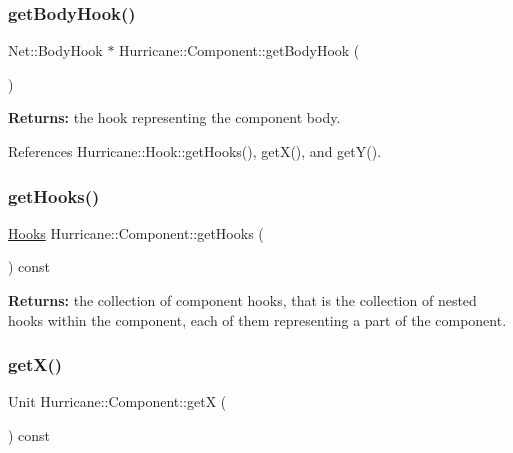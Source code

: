 \subsubsection{\texorpdfstring{get\+Body\+Hook()}{getBodyHook()}}
{\footnotesize\ttfamily Net\+::\+Body\+Hook $\ast$ Hurricane\+::\+Component\+::get\+Body\+Hook (\begin{DoxyParamCaption}{ }\end{DoxyParamCaption})\hspace{0.3cm}{\ttfamily [inline]}}

{\bfseries Returns\+:} the hook representing the component body. 

References Hurricane\+::\+Hook\+::get\+Hooks(), get\+X(), and get\+Y().

\mbox{\label{classHurricane_1_1Component_a1fc513b9465b2b8c22f41d56bf775594}} 
\subsubsection{\texorpdfstring{get\+Hooks()}{getHooks()}}
{\footnotesize\ttfamily \hyperlink{namespaceHurricane_a9dcd9b74dc5e2b51bec7a13c25807e02}{Hooks} Hurricane\+::\+Component\+::get\+Hooks (\begin{DoxyParamCaption}{ }\end{DoxyParamCaption}) const\hspace{0.3cm}{\ttfamily [virtual]}}

{\bfseries Returns\+:} the collection of component hooks, that is the collection of nested hooks within the component, each of them representing a part of the component. \mbox{\label{classHurricane_1_1Component_a0f8299ed73705fd4fbf56589dcc7e074}} 
\subsubsection{\texorpdfstring{get\+X()}{getX()}}
{\footnotesize\ttfamily Unit Hurricane\+::\+Component\+::getX (\begin{DoxyParamCaption}{ }\end{DoxyParamCaption}) const\hspace{0.3cm}{\ttfamily [pure virtual]}}

